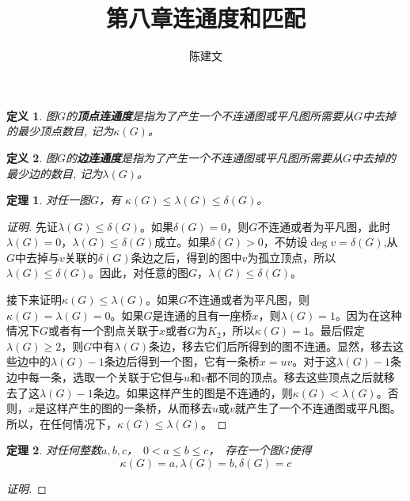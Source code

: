 \documentclass{article}
\newtheorem{Def}{定义}
\newtheorem{Thm}{定理}
\begin{document}
\begin{CJK*}{UTF8}{gbsn}
  \title{第八章连通度和匹配}
  \author{陈建文}
  \maketitle
  



  \begin{Def}
    图$G$的{\bfseries 顶点连通度}是指为了产生一个不连通图或平凡图所需要从$G$中去掉的最少顶点数目, 记为$\kappa (G)$。
  \end{Def}

  \begin{Def}
    图$G$的{\bfseries 边连通度}是指为了产生一个不连通图或平凡图所需要从$G$中去掉的最少边的数目, 记为$\lambda (G)$。
  \end{Def}
  \begin{Thm}
    对任一图$G$，有 $\kappa (G) \leq \lambda (G) \leq \delta (G)$。
  \end{Thm}
  \begin{proof}[证明]
    先证$\lambda (G) \leq \delta (G)$。如果$\delta(G) = 0$，则$G$不连通或者为平凡图，此时$\lambda(G) = 0$，$\lambda(G)\leq \delta(G)$成立。如果$\delta(G)>0$，不妨设$\deg v = \delta(G)$,从$G$中去掉与$v$关联的$\delta(G)$条边之后，得到的图中$v$为孤立顶点，所以$\lambda(G) \leq \delta(G)$。因此，对任意的图$G$，$\lambda(G)\leq \delta(G)$。

    接下来证明$\kappa (G) \leq \lambda (G)$。如果$G$不连通或者为平凡图，则$\kappa(G)=\lambda(G)=0$。如果$G$是连通的且有一座桥$x$，则$\lambda(G)=1$。因为在这种情况下$G$或者有一个割点关联于$x$或者$G$为$K_2$，所以$\kappa(G)=1$。最后假定$\lambda(G)\geq 2$，则$G$中有$\lambda(G)$条边，移去它们后所得到的图不连通。显然，移去这些边中的$\lambda(G)-1$条边后得到一个图，它有一条桥$x=uv$。对于这$\lambda(G)-1$条边中每一条，选取一个关联于它但与$u$和$v$都不同的顶点。移去这些顶点之后就移去了这$\lambda(G)-1$条边。如果这样产生的图是不连通的，则$\kappa(G) < \lambda(G)$。否则，$x$是这样产生的图的一条桥，从而移去$u$或$v$就产生了一个不连通图或平凡图。所以，在任何情况下，$\kappa(G) \leq \lambda(G)$。
  \end{proof}

    \begin{Thm}
    对任何整数$a,b,c$，　$0 < a \leq b \leq c$，　存在一个图$G$使得\[\kappa (G)
      = a, \lambda (G) = b, \delta (G) = c\]
  \end{Thm}
  \begin{proof}[证明]



\end{proof}
\end{CJK*}
\end{document}
